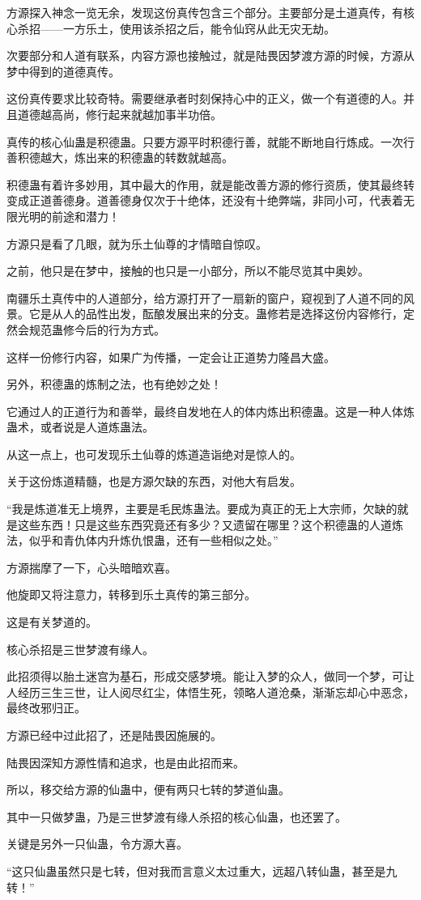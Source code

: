 \begin{this_body}
方源探入神念一览无余，发现这份真传包含三个部分。主要部分是土道真传，有核心杀招——一方乐土，使用该杀招之后，能令仙窍从此无灾无劫。

次要部分和人道有联系，内容方源也接触过，就是陆畏因梦渡方源的时候，方源从梦中得到的道德真传。

这份真传要求比较奇特。需要继承者时刻保持心中的正义，做一个有道德的人。并且道德越高尚，修行起来就越加事半功倍。

真传的核心仙蛊是积德蛊。只要方源平时积德行善，就能不断地自行炼成。一次行善积德越大，炼出来的积德蛊的转数就越高。

积德蛊有着许多妙用，其中最大的作用，就是能改善方源的修行资质，使其最终转变成正道善德身。道善德身仅次于十绝体，还没有十绝弊端，非同小可，代表着无限光明的前途和潜力！

方源只是看了几眼，就为乐土仙尊的才情暗自惊叹。

之前，他只是在梦中，接触的也只是一小部分，所以不能尽览其中奥妙。

南疆乐土真传中的人道部分，给方源打开了一扇新的窗户，窥视到了人道不同的风景。它是从人的品性出发，酝酿发展出来的分支。蛊修若是选择这份内容修行，定然会规范蛊修今后的行为方式。

这样一份修行内容，如果广为传播，一定会让正道势力隆昌大盛。

另外，积德蛊的炼制之法，也有绝妙之处！

它通过人的正道行为和善举，最终自发地在人的体内炼出积德蛊。这是一种人体炼蛊术，或者说是人道炼蛊法。

从这一点上，也可发现乐土仙尊的炼道造诣绝对是惊人的。

关于这份炼道精髓，也是方源欠缺的东西，对他大有启发。

“我是炼道准无上境界，主要是毛民炼蛊法。要成为真正的无上大宗师，欠缺的就是这些东西！只是这些东西究竟还有多少？又遗留在哪里？这个积德蛊的人道炼法，似乎和青仇体内升炼仇恨蛊，还有一些相似之处。”

方源揣摩了一下，心头暗暗欢喜。

他旋即又将注意力，转移到乐土真传的第三部分。

这是有关梦道的。

核心杀招是三世梦渡有缘人。

此招须得以胎土迷宫为基石，形成交感梦境。能让入梦的众人，做同一个梦，可让人经历三生三世，让人阅尽红尘，体悟生死，领略人道沧桑，渐渐忘却心中恶念，最终改邪归正。

方源已经中过此招了，还是陆畏因施展的。

陆畏因深知方源性情和追求，也是由此招而来。

所以，移交给方源的仙蛊中，便有两只七转的梦道仙蛊。

其中一只做梦蛊，乃是三世梦渡有缘人杀招的核心仙蛊，也还罢了。

关键是另外一只仙蛊，令方源大喜。

“这只仙蛊虽然只是七转，但对我而言意义太过重大，远超八转仙蛊，甚至是九转！”

\end{this_body}

